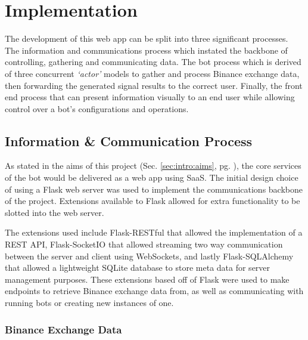 %
\chapter{Implementation}
\label{sec:implementation}

The development of this web app can be split into three significant processes. The information and communications process which instated the backbone of controlling, gathering and communicating data. The bot process which is derived of three concurrent \textit{`actor'} models to gather and process Binance exchange data, then forwarding the generated signal results to the correct user. Finally, the front end process that can present information visually to an end user while allowing control over a bot's configurations and operations.

\section{Information \& Communication Process}
\label{sec:implementation:info_comm}

\noindent As stated in the aims of this project (Sec. \ref{sec:intro:aims}, pg. \pageref{sec:intro:aims}), the core services of the bot would be delivered as a web app using SaaS. The initial design choice of using a Flask web server was used to implement the communications backbone of the project. Extensions available to Flask allowed for extra functionality to be slotted into the web server. 

The extensions used include Flask-RESTful that allowed the implementation of a REST API, Flask-SocketIO that allowed streaming two way communication between the server and client using WebSockets, and lastly Flask-SQLAlchemy that allowed a lightweight SQLite database to store meta data for server management purposes. These extensions based off of Flask were used to make endpoints to retrieve Binance exchange data from, as well as communicating with running bots or creating new instances of one.

\subsection{Binance Exchange Data}
\label{sec:implementation:info_comm:binance_exchange_data}



